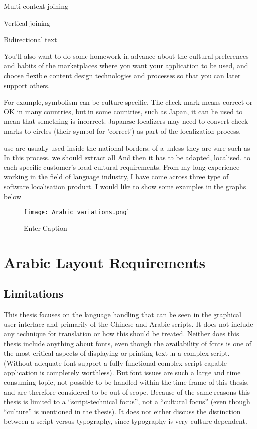 \documentclass[
	a4paper, %
	10pt, %
	unnumberedsections, %
	twoside, %
]{LTJournalArticle}
\begin{document}
Multi-context joining

Vertical joining


 Bidirectional text

You'll also want to do some homework in advance about the cultural preferences and habits of the marketplaces where you want your application to be used, and choose flexible content design technologies and processes so that you can later support others.

For example, symbolism can be culture-specific. The check mark means correct or OK in many countries, but in some countries, such as Japan, it can be used to mean that something is incorrect. Japanese localizers may need to convert check marks to circles (their symbol for 'correct') as part of the localization process.

use  are usually used inside the national borders. of a unless they are sure such as In this process, we should extract all And then it has to be adapted, localised, to each specific customer’s local cultural requirements. From my long experience working in the field of language industry, I have come across three type of software localisation product. I would like to show some examples in the graphs below

\begin{figure}
    \centering
    \texttt{[image: Arabic variations.png]}
    \caption{Enter Caption}
    \label{fig:enter-label}
\end{figure}

\section {Arabic Layout Requirements}

\subsection{Limitations}

This thesis focuses on the language handling that can be seen in the graphical user interface and primarily of the Chinese and Arabic scripts. It does not include any technique for translation or how this should be treated. Neither does this thesis include anything about fonts, even though the availability of fonts is one of the most critical aspects of displaying or printing text in a complex script. (Without adequate font support a fully functional complex script-capable application is completely worthless). But font issues are such a large and time consuming topic, not possible to be handled within the time frame of this thesis, and are therefore considered to be out of scope. Because of the same reasons this thesis is limited to a “script-technical focus”, not a “cultural focus” (even though “culture” is mentioned in the 
thesis). It does not either discuss the distinction between a script versus typography, since typography is very culture-dependent.
\end{document}
